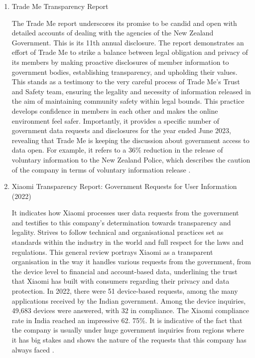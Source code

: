 \begin{enumerate}
 \item Trade Me Transparency Report

The Trade Me report underscores its promise to be candid and open with detailed accounts of dealing with the agencies of the New Zealand Government. This is its 11th annual disclosure. The report demonstrates an effort of Trade Me to strike a balance between legal obligation and privacy of its members by making proactive disclosures of member information to government bodies, establishing transparency, and upholding their values. This stands as a testimony to the very careful process of Trade Me's Trust and Safety team, ensuring the legality and necessity of information released in the aim of maintaining community safety within legal bounds. This practice develops confidence in members in each other and makes the online environment feel safer. Importantly, it provides a specific number of government data requests and disclosures for the year ended June 2023, revealing that Trade Me is keeping the discussion about government access to data open. For example, it refers to a 36\% reduction in the release of voluntary information to the New Zealand Police, which describes the caution of the company in terms of voluntary information release \cite{TradeMeTransparencyReport2023}.

\item Xiaomi Transparency Report: Government Requests for User Information (2022)

It indicates how Xiaomi processes user data requests from the government and testifies to this company's determination towards transparency and legality. Strives to follow technical and organisational practices set as standards within the industry in the world and full respect for the laws and regulations. This general review portrays Xiaomi as a transparent organisation in the way it handles various requests from the government, from the device level to financial and account-based data, underlining the trust that Xiaomi has built with consumers regarding their privacy and data protection. In 2022, there were 51 device-based requests, among the many applications received by the Indian government. Among the device inquiries, 49,683 devices were answered, with 32 in compliance. The Xiaomi compliance rate in India reached an impressive 62. 75\%. It is indicative of the fact that the company is usually under huge government inquiries from regions where it has big stakes and shows the nature of the requests that this company has always faced \cite{XiaomiTransparencyReport}.
 

\end{enumerate}
